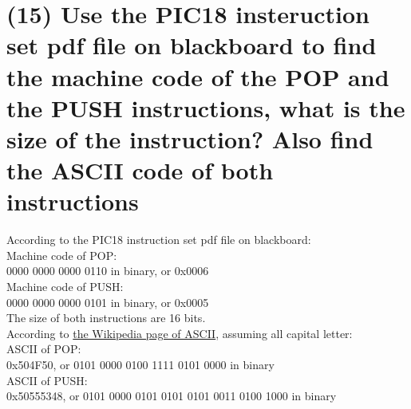 \documentclass{article}
\begin{document}
\newpage

\section{(15) Use the PIC18 insteruction set pdf file on blackboard to find the machine code of the POP and the PUSH instructions, what is the size of the instruction? Also find the ASCII code of both instructions}

According to the PIC18 instruction set pdf file on blackboard:\\
\newline
Machine code of POP:\\
0000 0000 0000 0110 in binary, or 0x0006\\
\newline
Machine code of PUSH:\\
0000 0000 0000 0101 in binary, or 0x0005\\

The size of both instructions are 16 bits.\\
\newline
According to \href{https://en.wikipedia.org/wiki/ASCII}{the Wikipedia page of ASCII}, assuming all capital letter:\\
\newline
ASCII of POP:\\
0x504F50, or 0101 0000 0100 1111 0101 0000 in binary\\
\newline
ASCII of PUSH:\\
0x50555348, or 0101 0000 0101 0101 0101 0011 0100 1000 in binary\\
\end{document}
